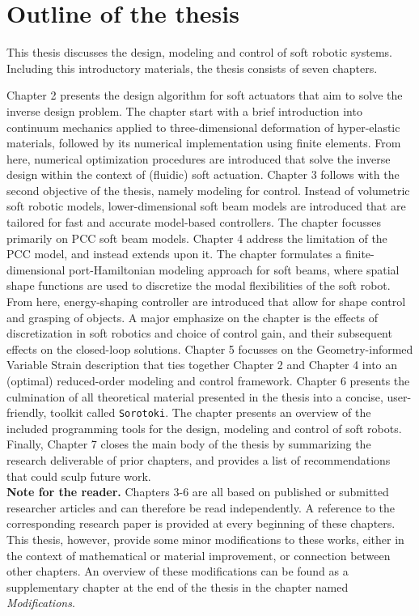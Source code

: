 \section{Outline of the thesis}
\label{sec:intro:outline}
This thesis discusses the design, modeling and control of soft robotic systems. Including this introductory materials, the thesis consists of seven chapters. 

Chapter 2 presents the design algorithm for soft actuators that aim to solve the inverse design problem. The chapter start with a brief introduction into continuum mechanics applied to three-dimensional deformation of hyper-elastic materials, followed by its numerical implementation using finite elements. From here, numerical optimization procedures are introduced that solve the inverse design within the context of (fluidic) soft actuation. Chapter 3 follows with the second objective of the thesis, namely modeling for control. Instead of volumetric soft robotic models, lower-dimensional soft beam models are introduced that are tailored for fast and accurate model-based controllers. The chapter focusses primarily on PCC soft beam models. Chapter 4 address the limitation of the PCC model, and instead extends upon it. The chapter formulates a finite-dimensional port-Hamiltonian modeling approach for soft beams, where spatial shape functions are used to discretize the modal flexibilities of the soft robot. From here, energy-shaping controller are introduced that allow for shape control and grasping of objects. A major emphasize on the chapter is the effects of discretization in soft robotics and choice of control gain, and their subsequent effects on the closed-loop solutions. Chapter 5 focusses on the Geometry-informed Variable Strain description that ties together Chapter 2 and Chapter 4 into an (optimal) reduced-order modeling and control framework. Chapter 6 presents the culmination of all theoretical material presented in the thesis into a concise, user-friendly, toolkit called \texttt{Sorotoki}. The chapter presents an overview of the included programming tools for the design, modeling and control of soft robots. Finally, Chapter 7 closes the main body of the thesis by summarizing the research deliverable of prior chapters, and provides a list of recommendations that could sculp future work.\\[0.1em]

\textbf{Note for the reader.} Chapters 3-6 are all based on published or submitted researcher articles and can therefore be read independently. A reference to the corresponding research paper is provided at every beginning of these chapters. This thesis, however, provide some minor modifications to these works, either in the context of mathematical or material improvement, or connection between other chapters. An overview of these modifications can be found as a supplementary chapter at the end of the thesis in the chapter named \textit{Modifications}. 

